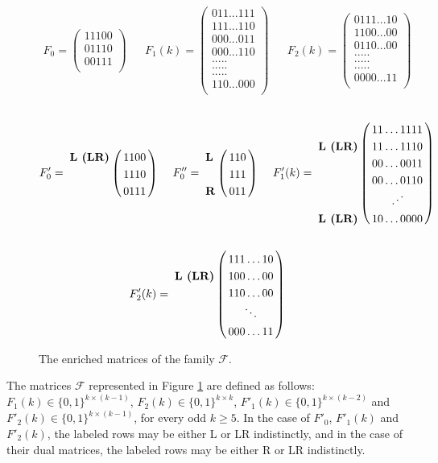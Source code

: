 \documentclass[12pt]{book}
\theoremstyle{plain}
\theoremstyle{remark}
\begin{document}
\begin{figure}[H] 
\small{
	\centering
	\begin{align*}
			F_0= \begin{pmatrix}
				11100\\
				01110\\
				00111\\
			\end{pmatrix}
			&&
			F_1(k)= \begin{pmatrix}
				011...111\\
				111...110\\
				000...011\\
				000...110\\
				.   .   .   .   . \\
				.   .   .   .   . \\
				.   .   .   .   . \\
				110...000\\
			\end{pmatrix}
			&&
			F_2(k)= \begin{pmatrix}
				0111...10\\
				1100...00\\
				0110...00\\
				.   .   .   .   . \\
				.   .   .   .   . \\
				.   .   .   .   . \\
				0000...11\\
			\end{pmatrix} 
			\end{align*}
			\begin{align*}
			F'_0= \bordermatrix{ & \cr
				\textbf{L (LR)} & 1 1 0 0 \cr
				 &1 1 1 0 \cr
				&0 1 1 1 }\			 
			&&
			F''_0= \bordermatrix{ & \cr
				\textbf{L} & 1 1 0 \cr
				 &1 1 1 \cr
				\textbf{R} &0 1 1 }\	
			&&
			F'_1(k)= \bordermatrix{ & \cr
				&11\ldots1111\cr
				\textbf{L (LR)}&11\ldots1110\cr
				&00\ldots0011\cr
				&00\ldots0110\cr
				& \iddots \cr
				\textbf{L (LR)}&10 \ldots 0000 }\
	\end{align*}
	\begin{align*}
			F'_2(k)= \bordermatrix{ & \cr
				&111\ldots10\cr
				\textbf{L (LR)}&100\ldots00\cr
				&110\ldots00\cr
				&  \ddots \cr
				&000\ldots11 }\
	\end{align*}
	}
	\caption{The enriched matrices of the family $\mathcal{F}$.}  \label{fig:forb_F}
\end{figure}

The matrices $\mathcal{F}$ represented in Figure \ref{fig:forb_F} are defined as follows:
$F_1(k) \in \{0,1\}^{k \times (k-1)}$, $F_2(k) \in \{0,1\}^{k \times k}$, $F'_1(k) \in \{0,1\}^{k \times (k-2)}$ and $F'_2(k) \in \{0,1\}^{k \times (k-1)}$, for every odd $k \geq 5$. In the case of $F'_0$, $F'_1(k)$ and $F'_2(k)$, the labeled rows may be either L or LR indistinctly, and in the case of their dual matrices, the labeled rows may be either R or LR indistinctly.
\end{document}
